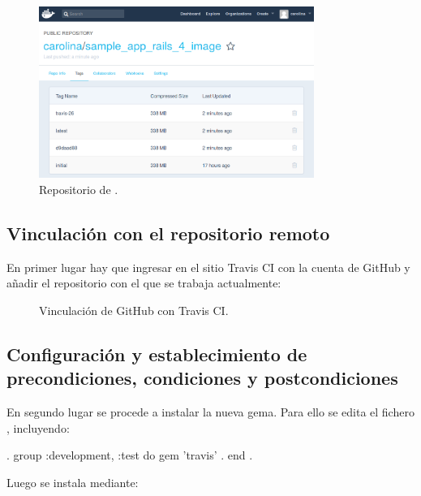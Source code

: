 \begin{figure}[H]
\centering
\includegraphics[width=0.8\textwidth]{images/figures/dockerhubimages.png}
\caption{Repositorio de .\label{fig:dockerhub_images}}
\end{figure}

\subsection{Vinculación con el repositorio remoto}

En primer lugar hay que ingresar en el sitio Travis CI con la cuenta de GitHub y añadir el repositorio con el que se trabaja actualmente:

\begin{figure}[H]
\caption{Vinculación de GitHub con Travis CI.\label{fig:travis_github}}
\end{figure}

\subsection{Configuración y establecimiento de precondiciones, condiciones y postcondiciones}

En segundo lugar se procede a instalar la nueva gema. Para ello se edita el fichero , incluyendo:

\begin{codelisting}
\label{code:addtravis}
\begin{code}
.
group :development, :test do
  gem 'travis'
.
end
.
\end{code}
\end{codelisting} 

Luego se instala mediante:


